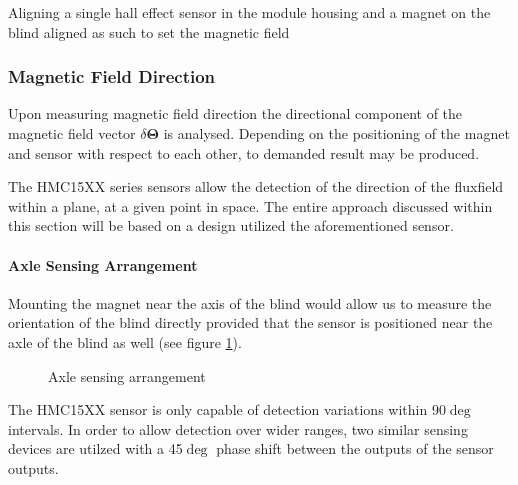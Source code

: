 \documentclass[]{article}
\begin{document}
Aligning a single hall effect sensor in the module housing and a magnet
on the blind aligned as such to set the magnetic field

\subsubsection{Magnetic Field Direction}\label{magnetic-field-direction}
Upon measuring magnetic field direction the directional component of the 
magnetic field vector $\delta\mathbf{\Theta}$ is analysed. Depending on the 
positioning of the magnet and sensor with respect to each other, to demanded
result may be produced.

The HMC15XX series sensors allow the detection of the direction of the 
fluxfield within a plane, at a given point in space. The entire approach 
discussed within this section will be based on a design utilized the 
aforementioned sensor.

\paragraph{Axle Sensing Arrangement}
Mounting the magnet near the axis of the blind would allow us to measure the
orientation of the blind directly provided that the sensor is positioned near
the axle of the blind as well (see figure \ref{fig:centersense}).
\begin{figure}[h!]
  \centering
  
  \caption{Axle sensing arrangement}
  \label{fig:centersense}
\end{figure}

The HMC15XX sensor is only capable of detection variations within  90$\deg$
intervals. In order to allow detection over wider ranges, two similar sensing
devices are utilzed with a 45$\deg$ phase shift between the outputs of the 
sensor outputs.

\end{document}
